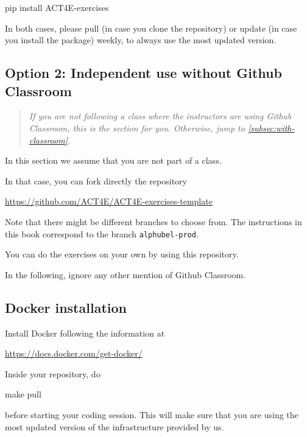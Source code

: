 \begin{console}
	pip install ACT4E-exercises
\end{console}

In both cases, please pull (in case you clone the repository) or update (in case you install the package) weekly, to always use the most updated version.

\subsection{Option 2: Independent use without Github Classroom}
\label{subsec:without-classroom}

\begin{quote}
	\emph{
		If you are \emph{not} following a class where the instructors are using Github Classroom,
		this is the section for you.
		Otherwise, jump to \cref{subsec:with-classroom}.
	}
\end{quote}

In this section we assume that you are not part of a class.

In that case, you can fork directly the repository

\url{https://github.com/ACT4E/ACT4E-exercises-template}

Note that there might be different branches to choose from.
The instructions in this book correspond to the branch \texttt{alphubel-prod}.

You can do the exercises on your own by using this repository.

In the following, ignore any other mention of Github Classroom.

\subsection{Docker installation}

Install Docker following the information at

\url{https://docs.docker.com/get-docker/}

Inside your repository, do

\begin{console}
	make pull
\end{console}

before starting your coding session.
This will make sure that you are using the most updated version of the infrastructure provided by us.

